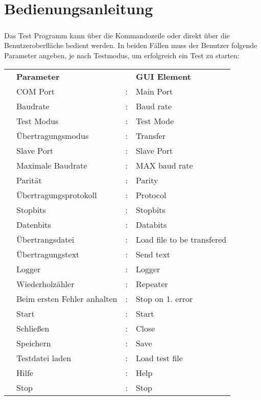 \chapter{Bedienungsanleitung}\label{chp:bedienungsanleitung}


\paragraph{}
Das Test Programm kann über die Kommandozeile oder direkt über die Benutzeroberfläche bedient werden. In beiden Fällen muss der Benutzer folgende Parameter angeben, je nach Testmodus, um erfolgreich ein Test zu starten:
\\
\begin{tabular}{llll}
\\ &\textbf{Parameter} & &\textbf{GUI Element}
\\ &COM Port &: &Main Port
\\ &Baudrate &: &Baud rate
\\ &Test Modus &: &Test Mode
\\ &Übertragungsmodus &: &Transfer
\\ &Slave Port &: &Slave Port
\\ &Maximale Baudrate &: &MAX baud rate
\\ &Parität &: &Parity
\\ &Übertragungsprotokoll &: &Protocol
\\ &Stopbits &: &Stopbits
\\ &Datenbits &: &Databits
\\ &Übertrangsdatei &: &Load file to be transfered
\\ &Übertragungstext &: &Send text
\\ &Logger &: &Logger
\\ &Wiederholzähler &: &Repeater
\\ &Beim ersten Fehler anhalten &: &Stop on 1. error
\\ &Start &: &Start
\\ &Schließen &: &Close
\\ &Speichern &: &Save
\\ &Testdatei laden &: &Load test file
\\ &Hilfe &: &Help
\\ &Stop &: &Stop
\end{tabular}


